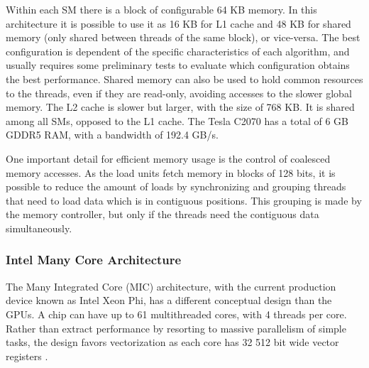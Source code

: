 Within each SM there is a block of configurable 64 KB memory. In this architecture it is possible to use it as 16 KB for L1 cache and 48 KB for shared memory (only shared between threads of the same block), or vice-versa. The best configuration is dependent of the specific characteristics of each algorithm, and usually requires some preliminary tests to evaluate which configuration obtains the best performance. Shared memory can also be used to hold common resources to the threads, even if they are read-only, avoiding accesses to the slower global memory. The L2 cache is slower but larger, with the size of 768 KB. It is shared among all SMs, opposed to the L1 cache. The Tesla C2070 has a total of 6 GB GDDR5 RAM, with a bandwidth of 192.4 GB/s.

One important detail for efficient memory usage is the control of coalesced memory accesses. As the load units fetch memory in blocks of 128 bits, it is possible to reduce the amount of loads by synchronizing and grouping threads that need to load data which is in contiguous positions. This grouping is made by the memory controller, but only if the threads need the contiguous data simultaneously.

\subsubsection*{Intel Many Core Architecture}
\label{MIC}

The \intel Many Integrated Core (MIC) architecture, with the current production device known as Intel Xeon Phi, has a different conceptual design than the \nvidia GPUs. A chip can have up to 61 multithreaded cores, with 4 threads per core. Rather than extract performance by resorting to massive parallelism of simple tasks, the design favors vectorization as each core has 32 512 bit wide vector registers \cite{Intel:MIC}.

